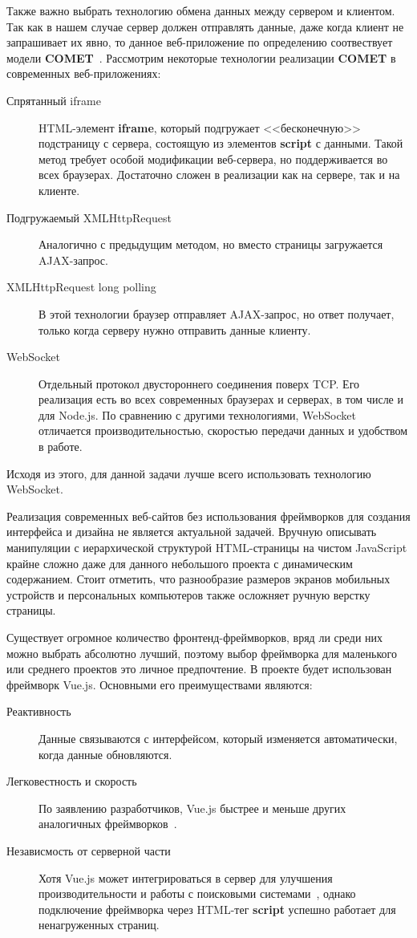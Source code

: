 Также важно выбрать технологию обмена данных между сервером и клиентом. Так как в нашем случае сервер должен отправлять данные, даже когда клиент не запрашивает их явно, то данное веб-приложение по определению соотвествует модели \textbf{COMET}~\autocite{Krill07}. Рассмотрим некоторые технологии реализации \textbf{COMET} в современных веб-приложениях:

\begin{description}
	\item[Спрятанный iframe] HTML-элемент \textbf{iframe}, который подгружает <<бесконечную>> подстраницу с сервера, состоящую из элементов \textbf{script} с данными. Такой метод требует особой модификации веб-сервера, но поддерживается во всех браузерах. Достаточно сложен в реализации как на сервере, так и на клиенте. 
	\item[Подгружаемый XMLHttpRequest] Аналогично с предыдущим методом, но вместо страницы загружается AJAX-запрос.
	\item[XMLHttpRequest long polling] В этой технологии браузер отправляет AJAX-запрос, но ответ получает, только когда серверу нужно отправить данные клиенту. 
	\item[WebSocket] Отдельный протокол двустороннего соединения поверх TCP. Его реализация есть во всех современных браузерах и серверах, в том числе и для Node.js. По сравнению с другими технологиями, WebSocket отличается производительностью, скоростью передачи данных и удобством в работе.
\end{description}

Исходя из этого, для данной задачи лучше всего использовать технологию WebSocket.

Реализация современных веб-сайтов без использования фреймворков для создания интерфейса и дизайна не является актуальной задачей. Вручную описывать манипуляции с иерархической структурой HTML-страницы на чистом JavaScript крайне сложно даже для данного небольшого проекта с динамическим содержанием. Стоит отметить, что разнообразие размеров экранов мобильных устройств и персональных компьютеров также осложняет ручную верстку страницы.

Существует огромное количество фронтенд-фреймворков, вряд ли среди них можно выбрать абсолютно лучший, поэтому выбор фреймворка для маленького или среднего проектов это личное предпочтение. В проекте будет использован фреймворк Vue.js. Основными его преимуществами являются:
	\begin{description}
		\item[Реактивность] Данные связываются с интерфейсом, который изменяется автоматически, когда данные обновляются.  
		\item[Легковестность и скорость] По заявлению разработчиков, Vue.js быстрее и меньше других аналогичных фреймворков~\autocite{vue}. 
		\item[Независмость от серверной части] Хотя Vue.js может интегрироваться в сервер для улучшения производительности и работы с поисковыми системами~\autocite{vue2}, однако подключение фреймворка через HTML-тег \textbf{script} успешно работает для ненагруженных страниц.  
		
	\end{description}    
 

